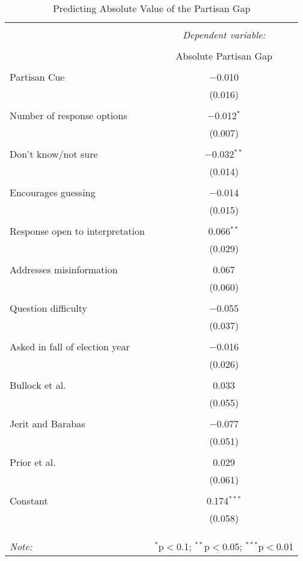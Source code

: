 
\begin{table}[!htbp] \centering 
  \caption{Predicting Absolute Value of the Partisan Gap} 
  \label{tab:tab1} 
\begin{tabular}{@{\extracolsep{5pt}}lc} 
\\[-1.8ex]\hline 
\hline \\[-1.8ex] 
 & \multicolumn{1}{c}{\textit{Dependent variable:}} \\ 
\cline{2-2} 
\\[-1.8ex] & Absolute Partisan Gap \\ 
\hline \\[-1.8ex] 
 Partisan Cue & $-$0.010 \\ 
  & (0.016) \\ 
  & \\ 
 Number of response options & $-$0.012$^{*}$ \\ 
  & (0.007) \\ 
  & \\ 
 Don't know/not sure & $-$0.032$^{**}$ \\ 
  & (0.014) \\ 
  & \\ 
 Encourages guessing & $-$0.014 \\ 
  & (0.015) \\ 
  & \\ 
 Response open to interpretation & 0.066$^{**}$ \\ 
  & (0.029) \\ 
  & \\ 
 Addresses misinformation & 0.067 \\ 
  & (0.060) \\ 
  & \\ 
 Question difficulty & $-$0.055 \\ 
  & (0.037) \\ 
  & \\ 
 Asked in fall of election year & $-$0.016 \\ 
  & (0.026) \\ 
  & \\ 
 Bullock et al. & 0.033 \\ 
  & (0.055) \\ 
  & \\ 
 Jerit and Barabas & $-$0.077 \\ 
  & (0.051) \\ 
  & \\ 
 Prior et al. & 0.029 \\ 
  & (0.061) \\ 
  & \\ 
 Constant & 0.174$^{***}$ \\ 
  & (0.058) \\ 
  & \\ 
\hline \\[-1.8ex] 
\hline 
\hline \\[-1.8ex] 
\textit{Note:}  & \multicolumn{1}{r}{$^{*}$p$<$0.1; $^{**}$p$<$0.05; $^{***}$p$<$0.01} \\ 
\end{tabular} 
\end{table} 
